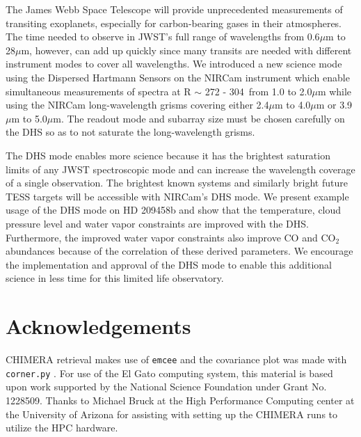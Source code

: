 \documentclass[iop]{emulateapj}
\newcommand{\DHSres}{272 - 304}
\begin{document}
The James Webb Space Telescope will provide unprecedented measurements of transiting exoplanets, especially for carbon-bearing gases in their atmospheres.
The time needed to observe in JWST's full range of wavelengths from 0.6$\mu$m to 28$\mu$m, however, can add up quickly since many transits are needed with different instrument modes to cover all wavelengths.
We introduced a new science mode using the Dispersed Hartmann Sensors on the NIRCam instrument which enable simultaneous measurements of spectra at R $\sim$ \DHSres\ from 1.0 to 2.0$\mu$m while using the NIRCam long-wavelength grisms covering either 2.4$\mu$m to 4.0$\mu$m or 3.9$\mu$m to 5.0$\mu$m.
The readout mode and subarray size must be chosen carefully on the DHS so as to not saturate the long-wavelength grisms.

The DHS mode enables more science because it has the brightest saturation limits of any JWST spectroscopic mode and can increase the wavelength coverage of a single observation.
The brightest known systems and similarly bright future TESS targets will be accessible with NIRCam's DHS mode.
We present example usage of the DHS mode on HD 209458b and show that the temperature, cloud pressure level and water vapor constraints are improved with the DHS.
Furthermore, the improved water vapor constraints also improve CO and CO$_2$ abundances because of the correlation of these derived parameters.
We encourage the implementation and approval of the DHS mode to enable this additional science in less time for this limited life observatory.

\section{Acknowledgements}

CHIMERA retrieval makes use of \texttt{emcee} \citep{foreman-mackey2013emcee} and the covariance plot was made with \texttt{corner.py} \citep{foremanCorner}.
For use of the El Gato computing system, this material is based upon work supported by the National Science Foundation under Grant No. 1228509.
Thanks to Michael Bruck at the High Performance Computing center at the University of Arizona for assisting with setting up the CHIMERA runs to utilize the HPC hardware.

\end{document}
